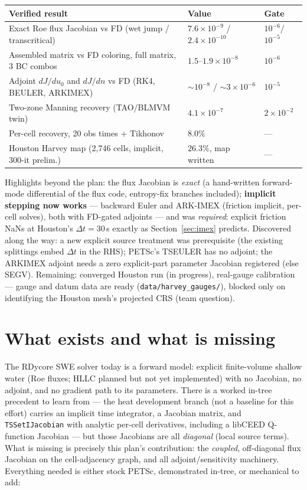\documentclass[11pt]{article}
\begin{document}
\medskip
\begin{center}\small
\begin{tabular}{@{}lll@{}}
\toprule
Verified result & Value & Gate \\
\midrule
Exact Roe flux Jacobian vs FD (wet jump / transcritical) & $7.6\times10^{-9}$ / $2.4\times10^{-10}$ & $10^{-6}$/$10^{-5}$ \\
Assembled matrix vs FD coloring, full matrix, 3 BC combos & $1.5$--$1.9\times10^{-8}$ & $10^{-6}$ \\
Adjoint $dJ/du_0$ and $dJ/dn$ vs FD (RK4, BEULER, ARKIMEX) & $\sim10^{-8}$ / $\sim3\times10^{-6}$ & $10^{-5}$ \\
Two-zone Manning recovery (TAO/BLMVM twin) & $4.1\times10^{-7}$ & $2\times10^{-2}$ \\
Per-cell recovery, 20 obs times + Tikhonov & $8.0\%$ & --- \\
Houston Harvey map (2{,}746 cells, implicit, 300-it prelim.) & $26.3\%$, map written & --- \\
\bottomrule
\end{tabular}
\end{center}

Highlights beyond the plan: the flux Jacobian is \emph{exact} (a
hand-written forward-mode differential of the flux code, entropy-fix
branches included); \textbf{implicit stepping now works} --- backward
Euler and ARK-IMEX (friction implicit, per-cell solves), both with
FD-gated adjoints --- and was \emph{required}: explicit friction NaNs at
Houston's $\Delta t = 30$\,s exactly as Section~\ref{sec:imex}
predicts. Discovered along the way: a new explicit source treatment was
prerequisite (the existing splittings embed $\Delta t$ in the RHS);
PETSc's TSEULER has no adjoint; the ARKIMEX adjoint needs a zero
explicit-part parameter Jacobian registered (else SEGV). Remaining:
converged Houston run (in progress), real-gauge calibration --- gauge
and datum data are ready (\texttt{data/harvey\_gauges/}), blocked only
on identifying the Houston mesh's projected CRS (team question).

\section{What exists and what is missing}

The RDycore SWE solver today is a forward model: explicit finite-volume
shallow water (Roe fluxes; HLLC planned but not yet implemented) with no
Jacobian, no adjoint, and no gradient path to its parameters. There is a worked in-tree precedent to
learn from --- the heat development branch (not a baseline for this
effort) carries an implicit time integrator, a Jacobian matrix, and
\texttt{TSSetIJacobian} with analytic per-cell derivatives, including a
libCEED Q-function Jacobian --- but those Jacobians are all
\emph{diagonal} (local source terms). What is missing is precisely this
plan's contribution: the \emph{coupled}, off-diagonal flux Jacobian on
the cell-adjacency graph, and all adjoint/sensitivity machinery.
Everything needed is either stock PETSc, demonstrated in-tree, or
mechanical to add:
\end{document}
